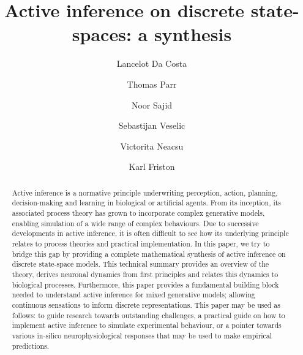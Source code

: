 \documentclass[review,12pt,authoryear]{elsarticle}
\begin{document}
\begin{frontmatter}



\title{Active inference on discrete state-spaces: a synthesis}





\author[1,2]{Lancelot Da Costa}
\author[2]{Thomas Parr}
\author[2]{Noor Sajid}
\author[2]{Sebastijan Veselic}
\author[2]{Victorita Neacsu}
\author[2]{Karl Friston}
\address[1]{Department of Mathematics, Imperial College London, London, SW7 2RH, United Kingdom}
\address[2]{Wellcome Centre for Human Neuroimaging, University College London, London, WC1N 3AR, United Kingdom}


\begin{abstract}
    Active inference is a normative principle underwriting perception, action, planning, decision-making and learning in biological or artificial agents. From its inception, its associated process theory has grown to incorporate complex generative models, enabling simulation of a wide range of complex behaviours. Due to successive developments in active inference, it is often difficult to see how its underlying principle relates to process theories and practical implementation. In this paper, we try to bridge this gap by providing a complete mathematical synthesis of active inference on discrete state-space models. This technical summary provides an overview of the theory, derives neuronal dynamics from first principles and relates this dynamics to biological processes. Furthermore, this paper provides a fundamental building block needed to understand active inference for mixed generative models; allowing continuous sensations to inform discrete representations. This paper may be used as follows: to guide research towards outstanding challenges, a practical guide on how to implement active inference to simulate experimental behaviour, or a pointer towards various in-silico neurophysiological responses that may be used to make empirical predictions.
\end{abstract}

\end{frontmatter}
\end{document}
